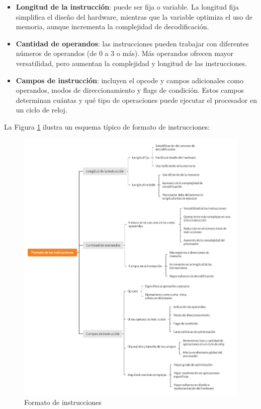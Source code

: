 \documentclass[12pt,oneside]{templates/unerthesis}
\providecommand{\tightlist}{%
  \setlength{\itemsep}{0pt}\setlength{\parskip}{0pt}}
\begin{document}
\begin{itemize}
\tightlist
\item
  \textbf{Longitud de la instrucción}: puede ser fija o variable. La longitud fija simplifica el diseño del hardware, mientras que la variable optimiza el uso de memoria, aunque incrementa la complejidad de decodificación.
\item
  \textbf{Cantidad de operandos}: las instrucciones pueden trabajar con diferentes números de operandos (de 0 a 3 o más). Más operandos ofrecen mayor versatilidad, pero aumentan la complejidad y longitud de las instrucciones.
\item
  \textbf{Campos de instrucción}: incluyen el opcode y campos adicionales como operandos, modos de direccionamiento y flags de condición. Estos campos determinan cuántas y qué tipo de operaciones puede ejecutar el procesador en un ciclo de reloj.
\end{itemize}

La Figura \ref{fig:forminst} ilustra un esquema típico de formato de instrucciones:

\begin{figure}

{\centering \includegraphics[width=1\linewidth]{images/formatoInst} 

}

\caption{Formato de instrucciones }\label{fig:forminst}
\end{figure}
\end{document}
